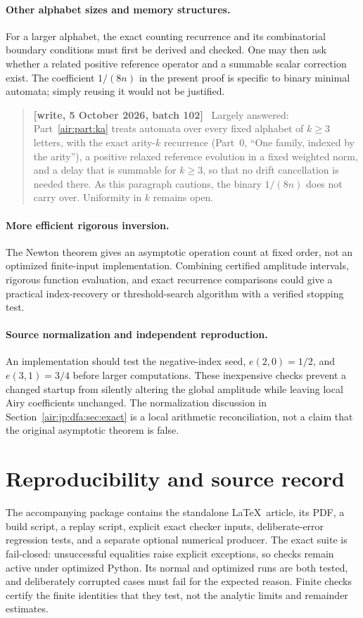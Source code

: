 \documentclass[11pt,letterpaper]{article}
\numberwithin{equation}{section}
\theoremstyle{remark}
\newenvironment{writenotejp}{\par\smallskip\begin{quote}\small\textbf{[write, 5 October 2026, batch 102]}\ }{\end{quote}\smallskip}
\begin{document}
\paragraph{Other alphabet sizes and memory structures.}
For a larger alphabet, the exact counting recurrence and its combinatorial boundary conditions must first be derived and checked. One may then ask whether a related positive reference operator and a summable scalar correction exist. The coefficient $1/(8n)$ in the present proof is specific to binary minimal automata; simply reusing it would not be justified.
\begin{writenotejp}
Largely answered: Part~\ref{air:part:ka} treats automata over every fixed alphabet of $k\ge3$ letters, with the exact arity-$k$ recurrence (Part~0, ``One family, indexed by the arity''), a positive relaxed reference evolution in a fixed weighted norm, and a delay that is summable for $k\ge3$, so that no drift cancellation is needed there. As this paragraph cautions, the binary $1/(8n)$ does not carry over. Uniformity in $k$ remains open.
\end{writenotejp}

\paragraph{More efficient rigorous inversion.}
The Newton theorem gives an asymptotic operation count at fixed order, not an optimized finite-input implementation. Combining certified amplitude intervals, rigorous function evaluation, and exact recurrence comparisons could give a practical index-recovery or threshold-search algorithm with a verified stopping test.

\paragraph{Source normalization and independent reproduction.}
An implementation should test the negative-index seed, $e(2,0)=1/2$, and $e(3,1)=3/4$ before larger computations. These inexpensive checks prevent a changed startup from silently altering the global amplitude while leaving local Airy coefficients unchanged. The normalization discussion in Section~\ref{air:jp:dfa:sec:exact} is a local arithmetic reconciliation, not a claim that the original asymptotic theorem is false.

\section{Reproducibility and source record}\label{air:jp:dfa:sec:reproduction}
The accompanying package contains the standalone \LaTeX\ article, its PDF, a build script, a replay script, explicit exact checker inputs, deliberate-error regression tests, and a separate optional numerical producer. The exact suite is fail-closed: unsuccessful equalities raise explicit exceptions, so checks remain active under optimized Python. Its normal and optimized runs are both tested, and deliberately corrupted cases must fail for the expected reason. Finite checks certify the finite identities that they test, not the analytic limits and remainder estimates.
\end{document}
